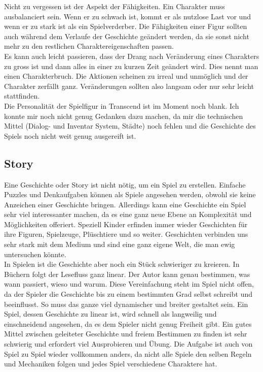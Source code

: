\documentclass[12pt,a4paper,titlepage]{article}
\begin{document}
		Nicht zu vergessen ist der Aspekt der Fähigkeiten. Ein Charakter muss ausbalanciert sein. Wenn er zu schwach ist, kommt er als nutzlose Last vor und wenn er zu stark ist als ein Spielverderber. Die Fähigkeiten einer Figur sollten auch während dem Verlaufe der Geschichte geändert werden, da sie sonst nicht mehr zu den restlichen Charaktereigenschaften passen.\\
		
		Es kann auch leicht passieren, dass der Drang nach Veränderung eines Charakters zu gross ist und dann alles in einer zu kurzen Zeit geändert wird. Dies nennt man einen Charakterbruch. Die Aktionen scheinen zu irreal und unmöglich und der Charakter zerfällt ganz. Veränderungen sollten also langsam oder nur sehr leicht stattfinden.\\
		
		Die Personalität der Spielfigur in Transcend ist im Moment noch blank. Ich konnte mir noch nicht genug Gedanken dazu machen, da mir die technischen Mittel (Dialog- und Inventar System, Städte) noch fehlen und die Geschichte des Spiels noch nicht weit genug ausgereift ist.
		
	\subsection{Story}
		Eine Geschichte oder Story ist nicht nötig, um ein Spiel zu erstellen. Einfache Puzzles und Denkaufgaben können als Spiele angesehen werden, obwohl sie keine Anzeichen einer Geschichte bringen. Allerdings kann eine Geschichte ein Spiel sehr viel interessanter machen, da es eine ganz neue Ebene an Komplexität und Möglichkeiten offeriert. Speziell Kinder erfinden immer wieder Geschichten für ihre Figuren, Spielzeuge, Plüschtiere und so weiter. Geschichten verbinden uns sehr stark mit dem Medium und sind eine ganz eigene Welt, die man ewig untersuchen könnte.\\
		
		In Spielen ist die Geschichte aber noch ein Stück schwieriger zu kreieren. In Büchern folgt der Lesefluss ganz linear. Der Autor kann genau bestimmen, was wann passiert, wieso und warum. Diese Vereinfachung steht im Spiel nicht offen, da der Spieler die Geschichte bis zu einem bestimmten Grad selbst schreibt und beeinflusst. So muss das ganze viel dynamischer und breiter gestaltet sein. Ein Spiel, dessen Geschichte zu linear ist, wird schnell als langweilig und einschneidend angesehen, da es dem Spieler nicht genug Freiheit gibt. Ein gutes Mittel zwischen geleiteter Geschichte und freiem Bestimmen zu finden ist sehr schwierig und erfordert viel Ausprobieren und Übung. Die Aufgabe ist auch von Spiel zu Spiel wieder vollkommen anders, da nicht alle Spiele den selben Regeln und Mechaniken folgen und jedes Spiel verschiedene Charaktere hat.\\
		
\end{document}
